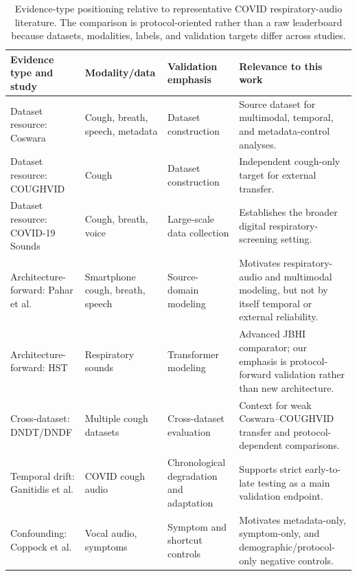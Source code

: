 \documentclass[journal]{IEEEtran}
\begin{document}
\begin{table}[t]
\caption{Evidence-type positioning relative to representative COVID respiratory-audio literature. The comparison is protocol-oriented rather than a raw leaderboard because datasets, modalities, labels, and validation targets differ across studies.}
\label{tab:jbhi_literature}
\centering
\scriptsize
\begin{tabularx}{\textwidth}{p{} p{} p{} Y}
\toprule
Evidence type and study & Modality/data & Validation emphasis & Relevance to this work \\
\midrule
Dataset resource: Coswara \cite{bhattacharya2023coswara} & Cough, breath, speech, metadata & Dataset construction & Source dataset for multimodal, temporal, and metadata-control analyses. \\
Dataset resource: COUGHVID \cite{orlandic2021coughvid} & Cough & Dataset construction & Independent cough-only target for external transfer. \\
Dataset resource: COVID-19 Sounds \cite{xia2021covid} & Cough, breath, voice & Large-scale data collection & Establishes the broader digital respiratory-screening setting. \\
Architecture-forward: Pahar et al. \cite{pahar2021global,pahar2022transfer} & Smartphone cough, breath, speech & Source-domain modeling & Motivates respiratory-audio and multimodal modeling, but not by itself temporal or external reliability. \\
Architecture-forward: HST \cite{aytekin2024hst} & Respiratory sounds & Transformer modeling & Advanced JBHI comparator; our emphasis is protocol-forward validation rather than new architecture. \\
Cross-dataset: DNDT/DNDF \cite{islam2026dndf} & Multiple cough datasets & Cross-dataset evaluation & Context for weak Coswara--COUGHVID transfer and protocol-dependent comparisons. \\
Temporal drift: Ganitidis et al. \cite{ganitidis2025drift} & COVID cough audio & Chronological degradation and adaptation & Supports strict early-to-late testing as a main validation endpoint. \\
Confounding: Coppock et al. \cite{coppock2024audio} & Vocal audio, symptoms & Symptom and shortcut controls & Motivates metadata-only, symptom-only, and demographic/protocol-only negative controls. \\
\bottomrule
\end{tabularx}
\end{table}
\end{document}
